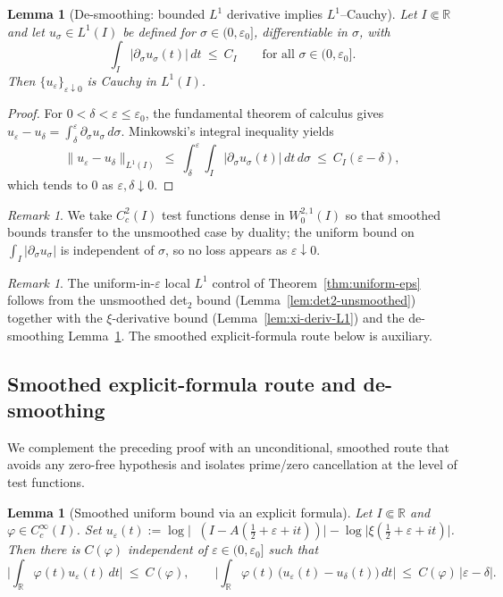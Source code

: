\documentclass[11pt]{article}
\newtheorem{lemma}[theorem]{Lemma}
\theoremstyle{definition}
\theoremstyle{remark}
\newtheorem{remark}[theorem]{Remark}
\newcommand{\R}{\mathbb{R}}
\DeclareMathOperator{\dettwo}{det_2}
\begin{document}
\begin{lemma}[De-smoothing: bounded $L^1$ derivative implies $L^1$–Cauchy]\label{lem:desmoothing}
Let \(I\Subset\R\) and let \(u_\sigma\in L^1(I)\) be defined for \(\sigma\in(0,\varepsilon_0]\), differentiable in \(\sigma\), with
\[
  \int_I |\partial_\sigma u_\sigma(t)|\,dt\ \le\ C_I\qquad\text{for all }\sigma\in(0,\varepsilon_0].
\]
Then \(\{u_\varepsilon\}_{\varepsilon\downarrow 0}\) is Cauchy in $L^1(I)$.
\end{lemma}
\begin{proof}
For \(0<\delta<\varepsilon\le\varepsilon_0\), the fundamental theorem of calculus gives
\(u_\varepsilon-u_\delta=\int_\delta^\varepsilon \partial_\sigma u_\sigma\,d\sigma\).
Minkowski's integral inequality yields
\[
  \|u_\varepsilon-u_\delta\|_{L^1(I)}\ \le\ \int_\delta^\varepsilon \int_I |\partial_\sigma u_\sigma(t)|\,dt\,d\sigma\ \le\ C_I(\varepsilon-\delta),
\]
which tends to $0$ as \(\varepsilon,\delta\downarrow 0\).
\end{proof}
\begin{remark}
We take \(C_c^2(I)\) test functions dense in \(W^{2,1}_0(I)\) so that smoothed bounds transfer to the unsmoothed case by duality; the uniform bound on \(\int_I|\partial_\sigma u_\sigma|\) is independent of \(\sigma\), so no loss appears as \(\varepsilon\downarrow 0\).
\end{remark}
\begin{remark}
The uniform-in-\(\varepsilon\) local $L^1$ control of Theorem~\ref{thm:uniform-eps} follows from the unsmoothed det$_2$ bound (Lemma~\ref{lem:det2-unsmoothed}) together with the \(\xi\)-derivative bound (Lemma~\ref{lem:xi-deriv-L1}) and the de-smoothing Lemma~\ref{lem:desmoothing}. The smoothed explicit-formula route below is auxiliary.
\end{remark}
\subsection{Smoothed explicit-formula route and de-smoothing}\label{subsec:smoothed-explicit}
We complement the preceding proof with an unconditional, smoothed route that avoids any zero-free hypothesis and isolates prime/zero cancellation at the level of test functions.

\begin{lemma}[Smoothed uniform bound via an explicit formula]\label{lem:smoothed-explicit}
Let \(I\Subset\R\) and \(\varphi\in C_c^{\infty}(I)\). Set \(u_\varepsilon(t):=\log\big|\dettwo(I-A(\tfrac12+\varepsilon+it))\big|-\log\big|\xi(\tfrac12+\varepsilon+it)\big|\). Then there is \(C(\varphi)\) independent of \(\varepsilon\in(0,\varepsilon_0]\) such that
\[
 \Big|\int_{\R} \varphi(t)u_\varepsilon(t)\,dt\Big|\ \le\ C(\varphi),\qquad \Big|\int_{\R} \varphi(t)\,\big(u_\varepsilon(t)-u_\delta(t)\big)\,dt\Big|\ \le\ C(\varphi)\,|\varepsilon-\delta|.
\]
\end{lemma}
\end{document}
